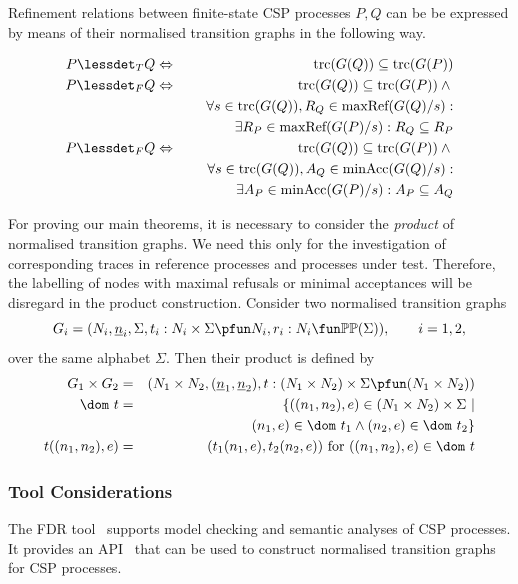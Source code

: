 Refinement relations between finite-state CSP processes $P, Q$ 
can be be expressed by means of their normalised transition graphs in the following way.

\begin{lemma}
\label{lemma:tgtrcref}
\begin{eqnarray}
P \lessdet_T Q & \Leftrightarrow & \trc(G(Q)) \subseteq\trc(G(P))
\label{eq:trcrefa}
\\
\label{eq:failrefa}
P \lessdet_F Q & \Leftrightarrow & \trc(G(Q)) \subseteq\trc(G(P)) \wedge {} \nonumber
\\ & & \forall s\in\trc(G(Q)), R_Q\in\maxrefs(G(Q)/s):  \nonumber
\\ & & \tabd
\exists R_P\in\maxrefs(G(P)/s): R_Q\subseteq R_P
\\
\label{eq:failrefb}
P \lessdet_F Q & \Leftrightarrow & \trc(G(Q)) \subseteq\trc(G(P)) \wedge {} \nonumber
\\ & & \forall s\in\trc(G(Q)), A_Q\in\minaccs(G(Q)/s): \nonumber
\\ & & \tabd
\exists A_P\in\minaccs(G(P)/s): A_P\subseteq A_Q
\end{eqnarray}
\end{lemma}

For proving our main theorems, it is necessary to consider the \emph{product} of 
normalised transition graphs. We need this only for the investigation of corresponding traces in reference processes and processes under test. Therefore, the 
labelling of nodes with maximal refusals or minimal acceptances   will be disregard in the 
product construction.
Consider two normalised transition graphs 
\[
G_i = ( N_i, \ii n_i, \Sigma, t_i : N_i\times\Sigma \pfun N_i, r_i : N_i \fun \mathbb{P}\mathbb{P}(\Sigma)),\qquad i = 1,2,
\]
over the same alphabet $\Sigma$. Then their product is defined by
\begin{eqnarray}
G_1\times G_2 & = & (N_1\times N_2,(\ii n_1,\ii n_2), t:(N_1\times N_2)\times\Sigma\pfun (N_1\times N_2))
\\
\dom~t & = & \{ ((n_1,n_2),e)\in (N_1\times N_2)\times\Sigma~|   \nonumber
\\ & & \tabc
(n_1,e)\in\dom~t_1\wedge 
(n_2,e) \in\dom~t_2    \}
\\
t((n_1,n_2),e) & = & (t_1(n_1,e),t_2(n_2,e))\ \text{for $((n_1,n_2),e)\in\dom~t$}
\end{eqnarray}



\subsubsection*{Tool Considerations}
The FDR tool~\cite{fdr} supports model checking and semantic analyses of CSP
processes. It provides an API~\cite{fdrmanual} that can be used to construct
normalised transition graphs for CSP processes.

